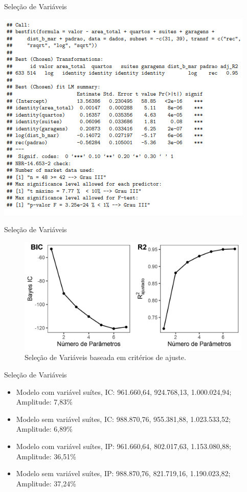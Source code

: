 \documentclass[9pt,ignorenonframetext,aspectratio=169]{beamer}
\providecommand{\tightlist}{%
  \setlength{\itemsep}{0pt}\setlength{\parskip}{0pt}}
\begin{document}
\begin{frame}{Seleção de Variáveis}
\protect\hypertarget{seleuxe7uxe3o-de-variuxe1veis}{}

\begin{center}\includegraphics[width=0.7\linewidth]{../../images/modelo} \end{center}

\end{frame}

\begin{frame}{Seleção de Variáveis}
\protect\hypertarget{seleuxe7uxe3o-de-variuxe1veis-1}{}

\begin{figure}

{\centering \includegraphics[width=0.7\linewidth]{../../images/regsub2-1} 

}

\caption{Seleção de Variáveis baseada em critérios de ajuste.}\label{fig:unnamed-chunk-3}
\end{figure}

\end{frame}

\begin{frame}{Seleção de Variáveis}
\protect\hypertarget{seleuxe7uxe3o-de-variuxe1veis-2}{}

\begin{itemize}[<+->]
\tightlist
\item
  Modelo com variável suítes, IC: 961.660,64, 924.768,13, 1.000.024,94;
  Amplitude: 7,83\%
\item
  Modelo sem variável suítes, IC: 988.870,76, 955.381,88, 1.023.533,52;
  Amplitude: 6,89\%
\item
  Modelo com variável suítes, IP: 961.660,64, 802.017,63, 1.153.080,88;
  Amplitude: 36,51\%
\item
  Modelo sem variável suítes, IP: 988.870,76, 821.719,16, 1.190.023,82;
  Amplitude: 37,24\%
\end{itemize}

\end{frame}
\end{document}
